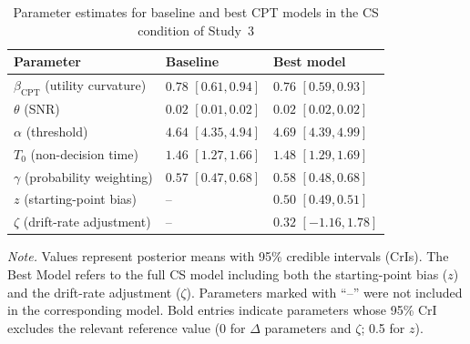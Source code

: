 \documentclass[man,floatsintext]{apa7}
\begin{document}
\begin{table}[!htbp]
\centering
\begin{threeparttable}\small
\caption{Parameter estimates for baseline and best CPT models in the CS condition of Study~3}
\label{tab:cpt_pe_cs_study3}
\begin{tabularx}{\linewidth}{@{} >{\raggedright\arraybackslash}p{6cm} >{\centering\arraybackslash}X >{\centering\arraybackslash}X @{}}
\toprule
\textbf{Parameter} & \textbf{Baseline} & \textbf{Best model} \\
\midrule
$\beta_{\text{CPT}}$ (utility curvature) & $0.78$ $[0.61, 0.94]$ & $0.76$ $[0.59, 0.93]$ \\
$\theta$ (SNR) & $0.02$ $[0.01, 0.02]$ & $0.02$ $[0.02, 0.02]$ \\
$\alpha$ (threshold) & $4.64$ $[4.35, 4.94]$ & $4.69$ $[4.39, 4.99]$ \\
$T_0$ (non-decision time) & $1.46$ $[1.27, 1.66]$ & $1.48$ $[1.29, 1.69]$ \\
$\gamma$ (probability weighting) & $0.57$ $[0.47, 0.68]$ & $0.58$ $[0.48, 0.68]$ \\
$z$ (starting-point bias) & -- & $0.50$ $[0.49, 0.51]$ \\
$\zeta$ (drift-rate adjustment) & -- & $0.32$ $[-1.16, 1.78]$ \\
\bottomrule
\end{tabularx}
\begin{tablenotes}
\item \textit{Note.} Values represent posterior means with 95\% credible intervals (CrIs). The Best Model refers to the full CS model including both the starting-point bias ($z$) and the drift-rate adjustment ($\zeta$). Parameters marked with ``--'' were not included in the corresponding model. Bold entries indicate parameters whose 95\% CrI excludes the relevant reference value (0 for $\Delta$ parameters and $\zeta$; 0.5 for $z$).
\end{tablenotes}
\end{threeparttable}
\end{table}
\end{document}
